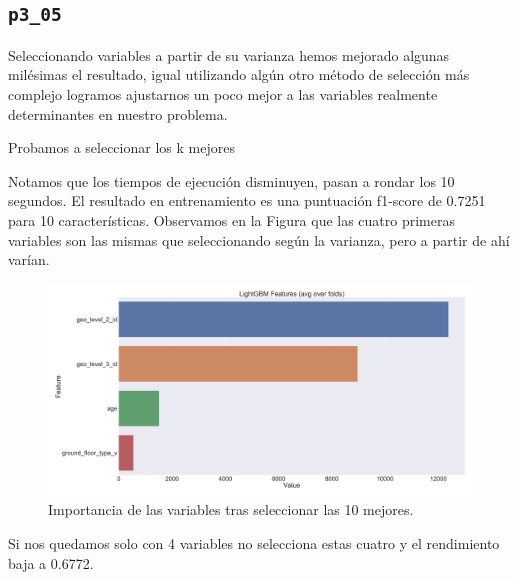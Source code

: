 \documentclass[a4paper, 20pt]{article}
\begin{document}
\subsection{\texttt{p3\_05}}
Seleccionando variables a partir de su varianza hemos mejorado algunas milésimas el resultado, igual utilizando algún otro método de selección más complejo logramos ajustarnos un poco mejor a las variables realmente determinantes en nuestro problema.

Probamos a seleccionar los k mejores

Notamos que los tiempos de ejecución disminuyen, pasan a rondar los 10 segundos. El resultado en entrenamiento es una puntuación f1-score de 0.7251 para 10 características. Observamos en la Figura 
\label{fig:lgbm_imp_05_10} que las cuatro primeras variables son las mismas que seleccionando según la varianza, pero a partir de ahí varían.
\begin{figure}[H]
    \centering
    \includegraphics[height=0.9\textwidth, width=1.0\textwidth]{lgbm_importances_05_10}
    \caption{Importancia de las variables tras seleccionar las 10 mejores. }
    \label{fig:lgbm_imp_05_10}
\end{figure}

Si nos quedamos solo con 4 variables no selecciona estas cuatro y el rendimiento baja a 0.6772.
\end{document}
